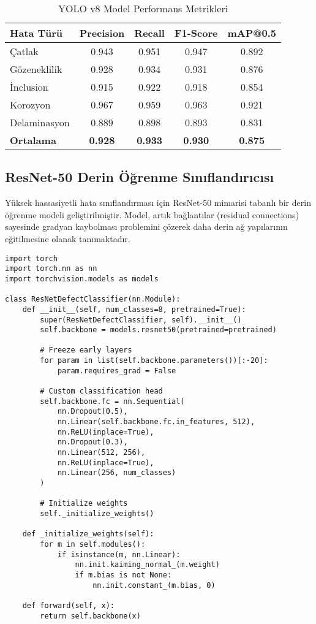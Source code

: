 \documentclass[12pt,a4paper]{article}
\begin{document}
\begin{table}[h]
\centering
\caption{YOLO v8 Model Performans Metrikleri}
\begin{tabular}{lcccc}
\toprule
\textbf{Hata Türü} & \textbf{Precision} & \textbf{Recall} & \textbf{F1-Score} & \textbf{mAP@0.5} \\
\midrule
Çatlak & 0.943 & 0.951 & 0.947 & 0.892 \\
Gözeneklilik & 0.928 & 0.934 & 0.931 & 0.876 \\
İnclusion & 0.915 & 0.922 & 0.918 & 0.854 \\
Korozyon & 0.967 & 0.959 & 0.963 & 0.921 \\
Delaminasyon & 0.889 & 0.898 & 0.893 & 0.831 \\
\midrule
\textbf{Ortalama} & \textbf{0.928} & \textbf{0.933} & \textbf{0.930} & \textbf{0.875} \\
\bottomrule
\end{tabular}
\end{table}

\subsection{ResNet-50 Derin Öğrenme Sınıflandırıcısı}

Yüksek hassasiyetli hata sınıflandırması için ResNet-50 mimarisi tabanlı bir derin öğrenme modeli geliştirilmiştir. Model, artık bağlantılar (residual connections) sayesinde gradyan kaybolması problemini çözerek daha derin ağ yapılarının eğitilmesine olanak tanımaktadır.

\begin{lstlisting}[style=python, caption=ResNet-50 Model Mimarisi Implementasyonu]
import torch
import torch.nn as nn
import torchvision.models as models

class ResNetDefectClassifier(nn.Module):
    def __init__(self, num_classes=8, pretrained=True):
        super(ResNetDefectClassifier, self).__init__()
        self.backbone = models.resnet50(pretrained=pretrained)
        
        # Freeze early layers
        for param in list(self.backbone.parameters())[:-20]:
            param.requires_grad = False
        
        # Custom classification head
        self.backbone.fc = nn.Sequential(
            nn.Dropout(0.5),
            nn.Linear(self.backbone.fc.in_features, 512),
            nn.ReLU(inplace=True),
            nn.Dropout(0.3),
            nn.Linear(512, 256),
            nn.ReLU(inplace=True),
            nn.Linear(256, num_classes)
        )
        
        # Initialize weights
        self._initialize_weights()
    
    def _initialize_weights(self):
        for m in self.modules():
            if isinstance(m, nn.Linear):
                nn.init.kaiming_normal_(m.weight)
                if m.bias is not None:
                    nn.init.constant_(m.bias, 0)
    
    def forward(self, x):
        return self.backbone(x)
\end{lstlisting}
\end{document}
